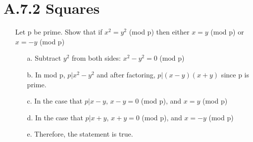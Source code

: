 \documentclass[12pt]{article}
\begin{document}
\section*{A.7.2 Squares}
\begin{enumerate}
  \item[] Let p be prime. Show that if $x^2 = y^2$ (mod p) then either $x = y$ (mod p) or $x = -y$ (mod p)
    \begin{enumerate}
      \item[a.] Subtract $y^2$ from both sides: $x^2-y^2 = 0$ (mod p)
      \item[b.] In mod p, $p | x^2-y^2$ and after factoring, $p | (x-y)(x+y)$ since p is prime. 
      \item[c.] In the case that $p | x-y$, $x-y = 0$ (mod p), and $x = y$ (mod p)
      \item[d.] In the case that $p | x+y$, $x+y = 0$  (mod p), and $x = -y$ (mod p)
      \item[e.] Therefore, the statement is true.
    \end{enumerate}
\end{enumerate}
\end{document}
